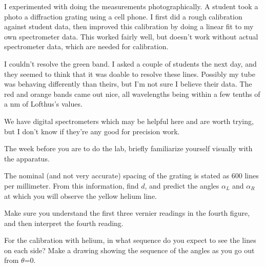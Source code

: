 I experimented with doing the measurements photographically.  A
student took a photo a diffraction grating using a cell phone.  I
first did a rough calibration against student data, then improved this
calibration by doing a linear fit to my own spectrometer data.
This worked fairly well, but doesn't work without actual spectrometer
data, which are needed for calibration.

I couldn't resolve the green band. I asked a couple of students the
next day, and they seemed to think that it was doable to resolve these
lines. Possibly my tube was behaving differently than theirs, but I'm
not sure I believe their data.  The red and orange bands came out
nice, all wavelengths being within a few tenths of a nm of Lofthus's
values.

We have digital spectrometers which may be helpful here and are worth
trying, but I don't know if they're any good for precision work.

\prelab

The week before you are to do the lab, briefly familiarize
yourself visually with the apparatus.

\prelabquestion  
The nominal (and not very accurate) spacing of the grating is stated
as 600 lines per millimeter. From this information, find $d$, and
predict the angles $\alpha_L$ and $\alpha_R$ at which you will observe the yellow helium line.


\prelabquestion  Make sure you understand the first three vernier
readings in the fourth figure, and then interpret the fourth reading.

\prelabquestion  For the calibration with helium,
in what sequence do you expect to see the lines on
each side? Make a drawing showing the sequence of the angles
as you go out from $\theta $=0.

